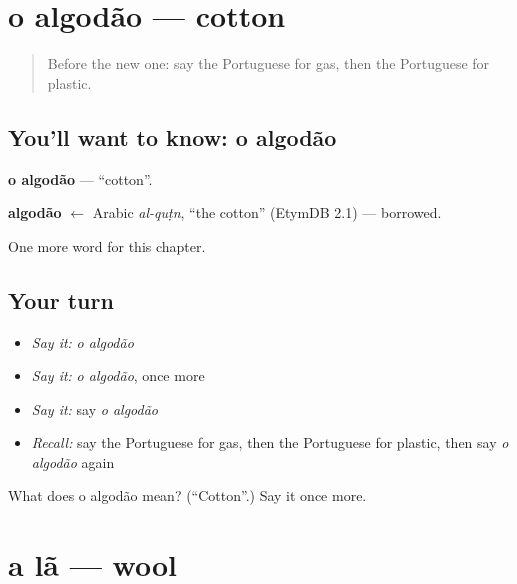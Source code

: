 \section[o algodão]{o algodão — cotton}

\label{lesson:PT-C251-algodao}



\begin{quote}
Before the new one: say the Portuguese for gas, then the Portuguese for plastic.
\end{quote}

\subsection*{You'll want to know: o algodão}
\textbf{o algodão} — \textquotedblleft{}cotton\textquotedblright{}.

\begin{cousinweb}
\textbf{algodão} $\leftarrow$ Arabic \emph{al-quṭn}, \textquotedblleft{}the cotton\textquotedblright{} (EtymDB 2.1) — borrowed.
\end{cousinweb}

\begin{grammarlens}[title={What you've built}]
One more word for this chapter.
\end{grammarlens}

\subsection*{Your turn}
\begin{itemize}
\raggedright
  \item \emph{Say it:} \emph{o algodão}
  \item \emph{Say it:} \emph{o algodão}, once more
  \item \emph{Say it:} say \emph{o algodão}
  \item \emph{Recall:} say the Portuguese for gas, then the Portuguese for plastic, then say \emph{o algodão} again
\end{itemize}

\begin{tcolorbox}[breakable,colback=teal!4,colframe=teal!35!black,title={Before you move on}]
What does o algodão mean? (\textquotedblleft{}Cotton\textquotedblright{}.) Say it once more.
\end{tcolorbox}
\section[a lã]{a lã — wool}

